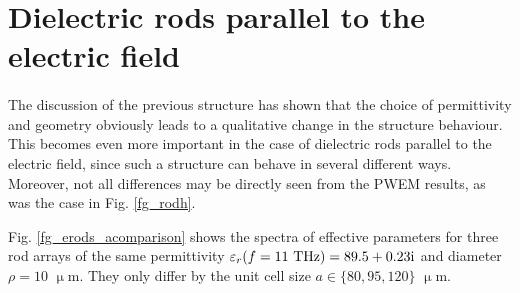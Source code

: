 \FloatBarrier %
\section{Dielectric rods parallel to the electric field} \label{sect_diel_rods_el} %
\paragraph{} %
The discussion of the previous structure has shown that the choice of permittivity and geometry obviously leads to a qualitative change in the structure behaviour. This becomes even more important in the case of dielectric rods parallel to the electric field, since such a structure can behave in several different ways. Moreover, not all differences may be directly seen from the PWEM results, as was the case in Fig. \ref{fg_rodh}.  %

Fig. \ref{fg_erods_acomparison} shows the spectra of effective parameters for three rod arrays of the same permittivity $\varepsilon_r(f=1\text{1 THz}) = 89.5+0.23{\mathrm i}$ and diameter $\rho=10$ $\upmu$m. They only differ by the unit cell size $a \in \{80, 95, 120\}$ $\upmu$m.


